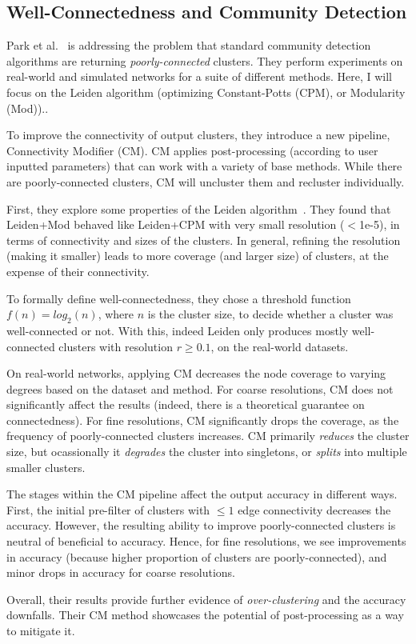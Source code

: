 \documentclass[../../main/main.tex]{subfiles}
\begin{document}
\subsection*{Well-Connectedness and Community Detection}

Park et al.~\cite{park24-11} is addressing the problem that standard community detection algorithms are returning \emph{poorly-connected} clusters.
They perform experiments on real-world and simulated networks for a suite of different methods.
Here, I will focus on the Leiden algorithm (optimizing Constant-Potts (CPM), or Modularity (Mod))..

To improve the connectivity of output clusters, they introduce a new pipeline, Connectivity Modifier (CM).
CM applies post-processing (according to user inputted parameters) that can work with a variety of base methods.
While there are poorly-connected clusters, CM will uncluster them and recluster individually.

First, they explore some properties of the Leiden algorithm~\cite{traag19-03}.
They found that Leiden+Mod behaved like Leiden+CPM with very small resolution ($<$1e-5), in terms of connectivity and sizes of the clusters.
In general, refining the resolution (making it smaller) leads to more coverage (and larger size) of clusters, at the expense of their connectivity.

To formally define well-connectedness, they chose a threshold function $f(n) = log_2(n)$, where $n$ is the cluster size, to decide whether a cluster was well-connected or not.
With this, indeed Leiden only produces mostly well-connected clusters with resolution $r \ge 0.1$, on the real-world datasets.

On real-world networks, applying CM decreases the node coverage to varying degrees based on the dataset and method.
For coarse resolutions, CM does not significantly affect the results (indeed, there is a theoretical guarantee on connectedness).
For fine resolutions, CM significantly drops the coverage, as the frequency of poorly-connected clusters increases.
CM primarily \emph{reduces} the cluster size, but ocassionally it \emph{degrades} the cluster into singletons, or \emph{splits} into multiple smaller clusters.

The stages within the CM pipeline affect the output accuracy in different ways.
First, the initial pre-filter of clusters with $\le 1$ edge connectivity decreases the accuracy.
However, the resulting ability to improve poorly-connected clusters is neutral of beneficial to accuracy.
Hence, for fine resolutions, we see improvements in accuracy (because higher proportion of clusters are poorly-connected), and minor drops in accuracy for coarse resolutions.

Overall, their results provide further evidence of \emph{over-clustering} and the accuracy downfalls.
Their CM method showcases the potential of post-processing as a way to mitigate it.

\bibsub
\end{document}
